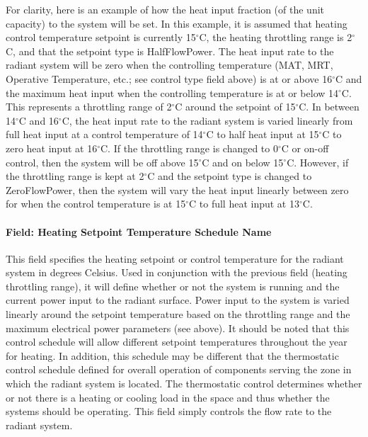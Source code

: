 For clarity, here is an example of how the heat input fraction (of the unit capacity) to the system will be set.  In this example, it is assumed that heating control temperature setpoint is currently 15$^\circ$C, the heating throttling range is 2$^\circ$C, and that the setpoint type is HalfFlowPower.  The heat input rate to the radiant system will be zero when the controlling temperature (MAT, MRT, Operative Temperature, etc.; see control type field above) is at or above 16$^\circ$C and the maximum heat input when the controlling temperature is at or below 14$^\circ$C. This represents a throttling range of 2$^\circ$C around the setpoint of 15$^\circ$C. In between 14$^\circ$C and 16$^\circ$C, the heat input rate to the radiant system is varied linearly from full heat input at a control temperature of 14$^\circ$C to half heat input at 15$^\circ$C to zero heat input at 16$^\circ$C.  If the throttling range is changed to 0$^\circ$C or on-off control, then the system will be off above 15$^\circ$C and on below 15$^\circ$C.  However, if the throttling range is kept at 2$^\circ$C and the setpoint type is changed to ZeroFlowPower, then the system will vary the heat input linearly between zero for when the control temperature is at 15$^\circ$C to full heat input at 13$^\circ$C.

\paragraph{Field: Heating Setpoint Temperature Schedule Name}\label{field-heating-setpoint-temperature-schedule-name}

This field specifies the heating setpoint or control temperature for the radiant system in degrees Celsius. Used in conjunction with the previous field (heating throttling range), it will define whether or not the system is running and the current power input to the radiant surface. Power input to the system is varied linearly around the setpoint temperature based on the throttling range and the maximum electrical power parameters (see above). It should be noted that this control schedule will allow different setpoint temperatures throughout the year for heating. In addition, this schedule may be different that the thermostatic control schedule defined for overall operation of components serving the zone in which the radiant system is located. The thermostatic control determines whether or not there is a heating or cooling load in the space and thus whether the systems should be operating. This field simply controls the flow rate to the radiant system.

